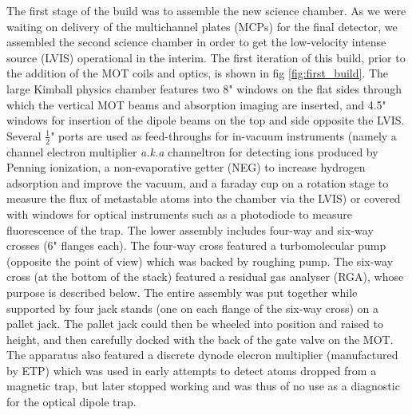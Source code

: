 	
	The first stage of the build was to assemble the new science chamber.
	As we were waiting on delivery of the multichannel plates (MCPs) for the final detector, we assembled the second science chamber in order to get the low-velocity intense source (LVIS) operational in the interim.
	The first iteration of this build, prior to the addition of the MOT coils and optics, is shown in fig \ref{fig:first_build}.
	The large Kimball physics chamber features two 8" windows on the flat sides through which the vertical MOT beams and absorption imaging are inserted, and 4.5" windows for insertion of the dipole beams on the top and side opposite the LVIS.
	Several $\frac{1}{2}$" ports are used as feed-throughs for in-vacuum instruments (namely a channel electron multiplier \emph{a.k.a} channeltron for detecting ions produced by Penning ionization, a non-evaporative getter (NEG) to increase hydrogen adsorption and improve the vacuum, and a faraday cup on a rotation stage to measure the flux of metastable atoms into the chamber via the LVIS) or covered with windows for optical instruments such as a photodiode to measure fluorescence of the trap.
	The lower assembly includes four-way and six-way crosses (6" flanges each).
	The four-way cross featured a turbomolecular pump (opposite the point of view) which was backed by roughing pump.
	The six-way cross (at the bottom of the stack) featured a residual gas analyser (RGA), whose purpose is described below.
	The entire assembly was put together while supported by four jack stands (one on each flange of the six-way cross) on a pallet jack.
	The pallet jack could then be wheeled into position and raised to height, and then carefully docked with the back of the gate valve on the MOT.
	The apparatus also featured a discrete dynode elecron multiplier (manufactured by ETP) which was used in early attempts to detect atoms dropped from a magnetic trap, but later stopped working and was thus of no use as a diagnostic for the optical dipole trap.

